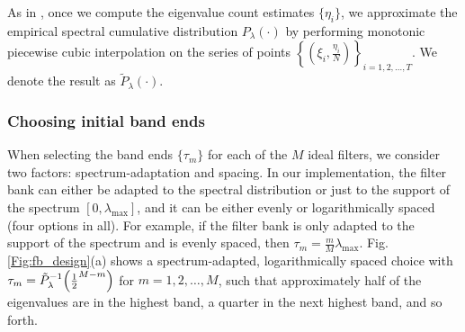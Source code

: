 \documentclass[journal, 10pt]{IEEEtran}
\begin{document}
As in \cite{shuman2013spectrum}, once we compute the eigenvalue count estimates $\{\eta_i\}$, we approximate the empirical spectral cumulative distribution $P_{\lambda}(\cdot)$ by performing monotonic piecewise cubic interpolation \cite{fritsch} on the series of points $\left\{\left(\xi_i,\frac{\eta_i}{N}\right)\right\}_{i=1,2,\ldots,T}$. We denote the result as $\tilde{P}_{\lambda}(\cdot)$.




\subsubsection{Choosing initial band ends}

When selecting the band ends $\{\tau_m\}$ for each of the $M$ ideal filters, we consider two factors: spectrum-adaptation and spacing. In our implementation, the filter bank can either be adapted to the spectral distribution or just to the support of the spectrum $[0,\lambda_{\max}]$, and it can be either evenly or logarithmically spaced (four options in all). For example, if the filter bank is only adapted to the support of the spectrum and is evenly spaced, then $\tau_m=\frac{m}{M}\lambda_{\max}$. Fig. \ref{Fig:fb_design}(a) shows a spectrum-adapted, logarithmically spaced choice with $\tau_m=\tilde{P}^{-1}_{\lambda}\Bigl(\frac{1}{2}^{M-m}\Bigr)$ for $m=1,2,\ldots,M$, such that approximately half of the eigenvalues are in the highest band, a quarter in the next highest band, and so forth. 
\end{document}

